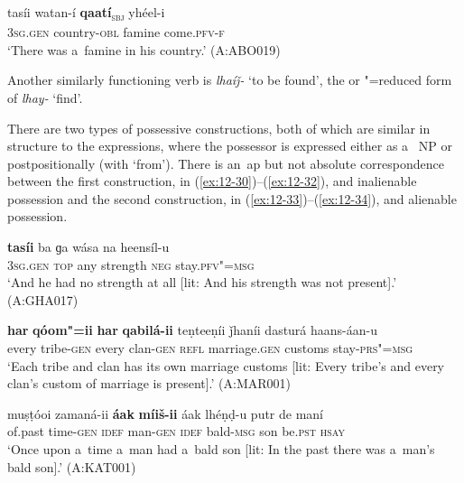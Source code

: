 \begin{exe}
\ex
\label{ex:12-29}
\gll tasíi watan-í {\ob}\textbf{qaatí}{\cb}\textsubscript{\textsc{\upshape sbj}} yhéel-i \\
\textsc{3sg.gen} country-\textsc{obl} famine come.\textsc{pfv-f} \\
\glt `There was a~famine in his country.' (A:ABO019)
\end{exe}

Another similarly functioning verb is \textit{lhaíǰ-} `to be found', the  or "=reduced form of \textit{lhay-} `find'.


 There are two types of possessive constructions, both of which are similar in structure to the  expressions, where the possessor is expressed either as a~ NP or postpositionally (with `from'). There is an~ap but not absolute correspondence between the first construction, in (\ref{ex:12-30})--(\ref{ex:12-32}), and inalienable possession and the second construction, in (\ref{ex:12-33})--(\ref{ex:12-34}), and alienable possession.

\begin{exe}
\ex
\label{ex:12-30}
\gll \textbf{tasíi} ba ɡa wása na heensíl-u \\
\textsc{3sg.gen} \textsc{top} any strength \textsc{neg} stay.\textsc{pfv"=msg} \\
\glt `And he had no strength at all [lit: And his strength was not present].' (A:GHA017)
\end{exe}

\ea
\label{ex:12-31}
\gll \textbf{har} \textbf{qóom"=ii} \textbf{har} \textbf{qabilá-ii} teṇteeṇíi ǰhaníi dasturá haans-áan-u\\
every tribe-\textsc{gen} every clan-\textsc{gen} \textsc{refl} marriage.\textsc{gen}  customs stay-\textsc{prs"=msg}\\
\glt `Each tribe and clan has its own marriage customs [lit: Every tribe's and every clan's custom of marriage is present].' (A:MAR001)

\ex
\label{ex:12-32}
\gll muṣṭóoi zamaná-ii \textbf{áak} \textbf{míiš-ii} áak lhéṇḍ-u putr de maní \\
of.past time-\textsc{gen} \textsc{idef} man-\textsc{gen} \textsc{idef} bald-\textsc{msg} son be.\textsc{pst} \textsc{hsay} \\
\glt `Once upon a~time a~man had a~bald son [lit: In the past there was a~man's bald son].' (A:KAT001)
\z

